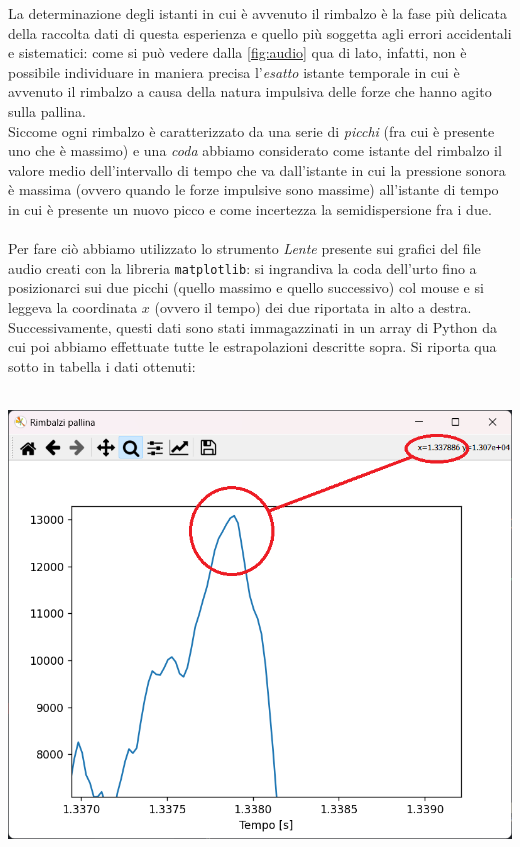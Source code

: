 \documentclass{article}
\begin{document}
\noindent La determinazione degli istanti in cui è avvenuto il rimbalzo è la fase più delicata della raccolta dati di questa esperienza e quello più soggetta agli errori accidentali e sistematici: come si può vedere dalla \ref{fig:audio} qua di lato, infatti, non è possibile individuare in maniera precisa l'\emph{esatto} istante temporale in cui è avvenuto il rimbalzo a causa della natura impulsiva delle forze che hanno agito sulla pallina. \\
Siccome ogni rimbalzo è caratterizzato da una serie di \emph{picchi} (fra cui è presente uno che è massimo) e una \emph{coda} abbiamo considerato come istante del rimbalzo il valore medio dell'intervallo di tempo che va dall'istante in cui la pressione sonora è massima (ovvero quando le forze impulsive sono massime) all'istante di tempo  in cui è presente un nuovo picco e come incertezza la semidispersione fra i due. \\ \\
Per fare ciò abbiamo utilizzato lo strumento \emph{Lente} presente sui grafici del file audio creati con la libreria \texttt{matplotlib}: si ingrandiva la coda dell'urto fino a posizionarci sui due picchi (quello massimo e quello successivo) col mouse e si leggeva la coordinata $x$ (ovvero il tempo) dei due riportata in alto a destra.
\noindent Successivamente, questi dati sono stati immagazzinati in un array di Python da cui poi abbiamo effettuate tutte le estrapolazioni descritte sopra. Si riporta qua sotto in tabella i dati ottenuti: \\ \\
\hspace{-0.05\textwidth} \begin{minipage}{0.5\textwidth}
	\centering
	\includegraphics[scale=0.40]{Esempio_misurazione.png}
\end{minipage}
\end{document}
